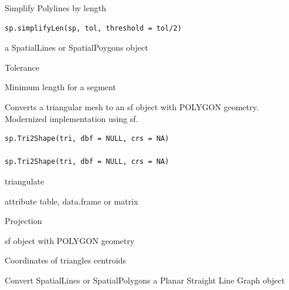 \documentclass[a4paper]{book}
\begin{document}
%
\begin{Description}\relax
Simplify Polylines by length
\end{Description}
%
\begin{Usage}
\begin{verbatim}
sp.simplifyLen(sp, tol, threshold = tol/2)
\end{verbatim}
\end{Usage}
%
\begin{Arguments}
\begin{ldescription}
\item[\code{sp}] a SpatialLines or SpatialPoygons object

\item[\code{tol}] Tolerance

\item[\code{threshold}] Minimum length for a segment
\end{ldescription}
\end{Arguments}
%
\begin{Description}\relax
Converts a triangular mesh to an sf object with POLYGON geometry.
Modernized implementation using sf.
\end{Description}
%
\begin{Usage}
\begin{verbatim}
sp.Tri2Shape(tri, dbf = NULL, crs = NA)

sp.Tri2Shape(tri, dbf = NULL, crs = NA)
\end{verbatim}
\end{Usage}
%
\begin{Arguments}
\begin{ldescription}
\item[\code{tri}] triangulate

\item[\code{dbf}] attribute table, data.frame or matrix

\item[\code{crs}] Projection
\end{ldescription}
\end{Arguments}
%
\begin{Value}
sf object with POLYGON geometry

Coordinates of triangles centroids
\end{Value}
%
\begin{Description}\relax
Convert SpatialLines or SpatialPolygons a Planar Straight Line Graph object
\end{Description}
\end{document}
